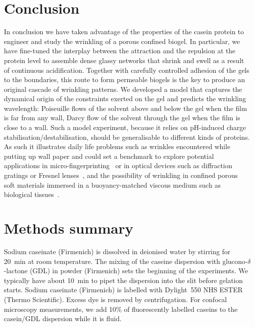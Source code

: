 \documentclass[twocolumn,superscriptaddress,showpacs,preprintnumbers,
amsmath,amssymb,prl]{revtex4-1}
\begin{document}
\section*{Conclusion}

In conclusion we have taken advantage of the properties of the casein protein to engineer and study the wrinkling of a porous confined biogel. In particular, we have fine-tuned the interplay between the attraction and the repulsion at the protein level to assemble dense glassy networks that shrink and swell as a result of continuous acidification. Together with carefully controlled adhesion of the gels to the boundaries, this route to form permeable biogels is the key to produce an original cascade of wrinkling patterns. We developed a model that captures the dynamical origin of the constraints exerted on the gel and predicts the wrinkling wavelength: Poiseuille flows of the solvent above and below the gel when the film is far from any wall, Darcy flow of the solvent through the gel when the film is close to a wall. Such a model experiment, because it relies on pH-induced charge stabilisation/destabilisation, should be generalisable to different kinds of proteins. As such it illustrates daily life problems such as wrinkles encountered while putting up wall paper and could set a benchmark to explore potential applications in micro-fingerprinting~\cite{Bae2015} or in optical devices such as diffraction gratings or Fresnel lenses~\cite{Li2013}, and the possibility of wrinkling in confined porous soft materials immersed in a buoyancy-matched viscous medium such as biological tissues~\cite{Ma2004,Longley2013,Fleury2015}.



\section*{Methods summary}

Sodium caseinate (Firmenich) is dissolved in deionised water by stirring for \SI{20}{\minute} at room temperature. The mixing of the caseine dispersion with glucono-$\delta$-lactone (GDL) in powder (Firmenich) sets the beginning of the experiments. We typically have about \SI{10}{\minute} to pipet the dispersion into the slit before gelation starts. Sodium caseinate (Firmenich) is labelled with Dylight~550 NHS ESTER (Thermo Scientific). Excess dye is removed by centrifugation. For confocal microscopy measurements, we add 10\% of fluorescently labelled caseins to the casein/GDL dispersion while it is fluid.
\end{document}
